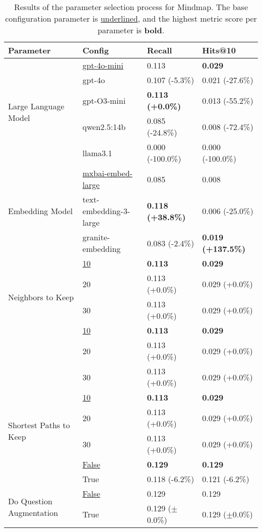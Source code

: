 \begin{table}[t]
    \centering
    \begin{tabular}{llll}
        \toprule
        \textbf{Parameter } & \textbf{Config} & \textbf{Recall} & \textbf{Hits@10} \\
        \midrule
        \multirow{5}{*}{Large Language Model} 
            & \underline{gpt-4o-mini} & 0.113 & \textbf{0.029} \\
            & gpt-4o & 0.107 (-5.3\%) & 0.021 (-27.6\%) \\
            & gpt-O3-mini & \textbf{0.113 (+0.0\%)} & 0.013 (-55.2\%) \\
            & qwen2.5:14b & 0.085 (-24.8\%) & 0.008 (-72.4\%) \\
            & llama3.1 & 0.000 (-100.0\%) & 0.000 (-100.0\%) \\
        \midrule
        \multirow{3}{*}{Embedding Model} 
            & \underline{mxbai-embed-large} & 0.085 & 0.008 \\
            & text-embedding-3-large & \textbf{0.118 (+38.8\%)} & 0.006 (-25.0\%) \\
            & granite-embedding & 0.083 (-2.4\%) & \textbf{0.019 (+137.5\%)} \\
        \midrule
        \multirow{4}{*}{Neighbors to Keep}
            & \underline{10} & \textbf{0.113} & \textbf{0.029} \\
            & 20 & 0.113 (+0.0\%) & 0.029 (+0.0\%) \\
            & 30 & 0.113 (+0.0\%) & 0.029 (+0.0\%) \\
        \midrule
        \multirow{4}{*}{Final Paths to Keep}
            & \underline{10} & \textbf{0.113} & \textbf{0.029} \\
            & 20 & 0.113 (+0.0\%) & 0.029 (+0.0\%) \\
            & 30 & 0.113 (+0.0\%) & 0.029 (+0.0\%) \\
        \midrule
        \multirow{4}{*}{Shortest Paths to Keep}
            & \underline{10} & \textbf{0.113} & \textbf{0.029} \\
            & 20 & 0.113 (+0.0\%) & 0.029 (+0.0\%) \\
            & 30 & 0.113 (+0.0\%) & 0.029 (+0.0\%) \\
        \midrule
        \multirow{2}{*}{Do Reranking} 
            & \underline{False} & \textbf{0.129} & \textbf{0.129} \\
            & True & 0.118 (-6.2\%) & 0.121 (-6.2\%) \\      
        \midrule
        \multirow{2}{*}{Do Question Augmentation} 
            & \underline{False} & 0.129 & 0.129 \\
            & True & 0.129 (\(\pm\)0.0\%) & 0.129 (\(\pm\)0.0\%) \\
        \bottomrule
    \end{tabular}
    \caption[Results of the Parameter Selection Process for Mindmap]{Results of the parameter selection process for Mindmap. The base configuration parameter is \underline{underlined}, and the highest metric score per parameter is \textbf{bold}.}
    \label{tab:mindmap_parameter_selection}
\end{table}

